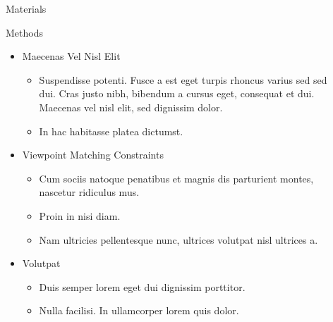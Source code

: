 \documentclass[final,hyperref={pdfpagelabels=false}]{beamer}
\begin{document}
\begin{frame}[t]
\begin{columns}[t]
\begin{column}{.465\textwidth}
\begin{block}{Materials}
\end{block}


\begin{block}{Methods}

\begin{itemize}
\item Maecenas Vel Nisl Elit
\begin{itemize}
\item Suspendisse potenti. Fusce a est eget turpis rhoncus varius sed sed dui. Cras justo nibh, bibendum a cursus eget, consequat et dui. Maecenas vel nisl elit, sed dignissim dolor. 
\item In hac habitasse platea dictumst.
\end{itemize}

\item Viewpoint Matching Constraints
\begin{itemize}
\item Cum sociis natoque penatibus et magnis dis parturient montes, nascetur ridiculus mus. 
\item Proin in nisi diam.
\item Nam ultricies pellentesque nunc, ultrices volutpat nisl ultrices a.
\end{itemize}

\item Volutpat 
\begin{itemize}
\item Duis semper lorem eget dui dignissim porttitor.
\item Nulla facilisi. In ullamcorper lorem quis dolor.
\end{itemize}
\end{itemize}

\end{block}

\end{column} %

\begin{column}{.03\textwidth}\end{column} %
 
\begin{column}{.465\textwidth} %


\end{column}
\end{columns}
\end{frame}
\end{document}
